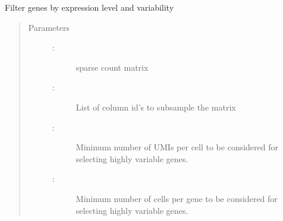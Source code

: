 \documentclass[letterpaper,10pt,english]{sphinxmanual}
\begin{document}
\begin{fulllineitems}
\label{\detokenize{cospar.hf.filter_genes:cospar.hf.filter_genes}}
Filter genes by expression level and variability
\begin{quote}\begin{description}
\item[{Parameters}] \leavevmode\begin{description}
\item[{ : }] \leavevmode
sparse count matrix

\item[{ : }] \leavevmode
List of column id’s to sub\sphinxhyphen{}sample the matrix

\item[{ : \sphinxstyleliteralemphasis{\sphinxupquote{, }}\sphinxstyleliteralemphasis{\sphinxupquote{ (}}\sphinxstyleliteralemphasis{\sphinxupquote{)}}}] \leavevmode
Minimum number of UMIs per cell to be considered for selecting highly variable genes.

\item[{ : \sphinxstyleliteralemphasis{\sphinxupquote{, }}\sphinxstyleliteralemphasis{\sphinxupquote{ (}}\sphinxstyleliteralemphasis{\sphinxupquote{)}}}] \leavevmode
Minimum number of cells per gene to be considered for selecting highly variable genes.


\end{description}
\end{description}
\end{quote}
\end{fulllineitems}
\end{document}
